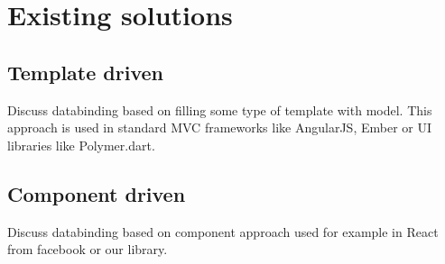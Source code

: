 \chapter{Existing solutions}\label{chap:existingsolutions}

\section{Template driven}\label{sec:template}

Discuss databinding based on filling some type of template with model. 
This approach is used in standard MVC frameworks like AngularJS, Ember or UI libraries like Polymer.dart.

\section{Component driven}\label{sec:component}

Discuss databinding based on component approach used for example in React from facebook or our library.

